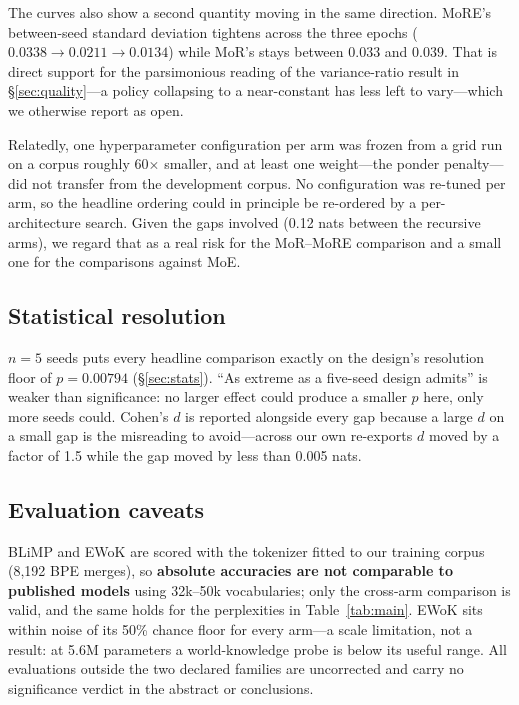 The curves also show a second quantity moving in the same direction. MoRE's
between-seed standard deviation tightens across the three epochs
($0.0338 \rightarrow 0.0211 \rightarrow 0.0134$) while MoR's stays between
$0.033$ and $0.039$. That is direct support for the parsimonious reading of the
variance-ratio result in \S\ref{sec:quality}---a policy collapsing to a
near-constant has less left to vary---which we otherwise report as open.

Relatedly, one hyperparameter configuration per arm was frozen from a grid run on a
corpus roughly 60$\times$ smaller, and at least one weight---the ponder
penalty---did not transfer from the development corpus. No configuration was
re-tuned per arm, so the headline ordering could in principle be re-ordered by a
per-architecture search. Given the gaps involved (0.12 nats between the recursive arms), we regard
that as a real risk for the MoR--MoRE comparison and a small one for the comparisons
against MoE.

\subsection{Statistical resolution}

$n = 5$ seeds puts every headline comparison exactly on the design's resolution
floor of $p = 0.00794$ (\S\ref{sec:stats}). ``As extreme as a five-seed design
admits'' is weaker than significance: no larger effect could produce a smaller $p$
here, only more seeds could. Cohen's
$d$ is reported alongside every gap because a large $d$ on a small gap is the
misreading to avoid---across our own re-exports $d$ moved by a factor of 1.5 while
the gap moved by less than 0.005 nats.

\subsection{Evaluation caveats}

BLiMP and EWoK are scored with the tokenizer fitted to our training corpus
(8{,}192 BPE merges), so \textbf{absolute accuracies are not comparable to
published models} using 32k--50k vocabularies; only the cross-arm comparison is
valid, and the same holds for the perplexities in Table~\ref{tab:main}. EWoK sits
within noise of its 50\% chance floor for every arm---a scale limitation, not a
result: at 5.6M parameters a world-knowledge probe is below its useful range. All
evaluations outside the two declared families are uncorrected and carry no
significance verdict in the abstract or conclusions.

